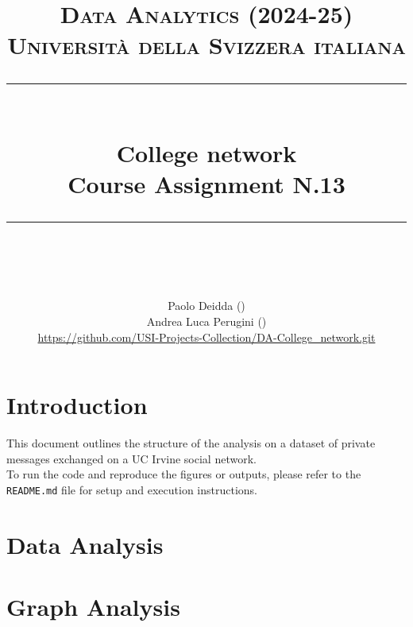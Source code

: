 \documentclass{article}
\title{
	\normalfont\normalsize
	\textsc{Data Analytics (2024-25)\\%
	Universit\`a della Svizzera italiana}\\
	\vspace{5pt}
	\rule{\linewidth}{0.5pt}\\
	{\huge College network\\
	\small Course Assignment N.13}\\
	\rule{\linewidth}{1pt}\\
	\vspace{5pt}
}
\author{
	Paolo Deidda (\text{paolo.deidda@usi.ch}) \\ 
	Andrea Luca Perugini (\text{andrea.perugini@usi.ch})\\
	\url{https://github.com/USI-Projects-Collection/DA-College_network.git}
}
\begin{document}
\maketitle

\tableofcontents

\newpage

\section*{Introduction}
This document outlines the structure of the analysis on a dataset of private messages exchanged on a UC Irvine social network.\\

To run the code and reproduce the figures or outputs, please refer to the \texttt{README.md} file for setup and execution instructions.

\section{Data Analysis}


\newpage

\section{Graph Analysis}

\end{document}

